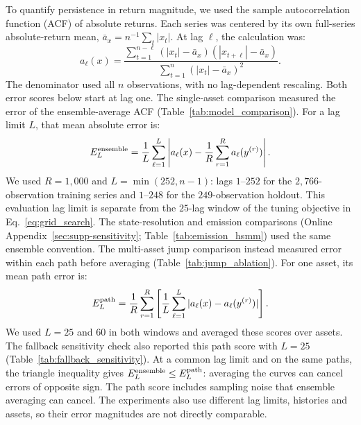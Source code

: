 To quantify persistence in return magnitude, we used the sample
autocorrelation function (ACF) of absolute returns. Each series was
centered by its own full-series absolute-return mean,
$\bar a_x=n^{-1}\sum_t|x_t|$. At lag $\ell$, the calculation was:
\begin{equation}
 a_\ell(x)=
 \frac{\sum_{t=1}^{n-\ell}(|x_t|-\bar a_x)(|x_{t+\ell}|-\bar a_x)}
      {\sum_{t=1}^{n}(|x_t|-\bar a_x)^2}.
 \label{eq:sample-absolute-acf}
\end{equation}
The denominator used all $n$ observations, with no lag-dependent
rescaling. Both error scores below start at lag one.
The single-asset comparison measured the error of the ensemble-average
ACF (Table~\ref{tab:model_comparison}). For a lag limit $L$, that
mean absolute error is:
\begin{equation}
 E^{\rm ensemble}_L=\frac{1}{L}\sum_{\ell=1}^{L}
 \left|a_\ell(x)-\frac{1}{R}\sum_{r=1}^{R}a_\ell(y^{(r)})\right|.
 \label{eq:acf-ensemble-error}
\end{equation}
We used $R=1{,}000$ and $L=\min(252,n-1)$: lags $1$--$252$
for the $2{,}766$-observation training series and $1$--$248$ for the
$249$-observation holdout. This evaluation lag limit is separate from
the $25$-lag window of the tuning objective in
Eq.~\eqref{eq:grid_search}. The state-resolution and emission
comparisons (Online Appendix~\ref{sec:supp-sensitivity}; Table~\ref{tab:emission_hsmm}) used the same ensemble convention.
The multi-asset jump comparison instead measured error within each
path before averaging (Table~\ref{tab:jump_ablation}). For one
asset, its mean path error is:
\begin{equation}
 E^{\rm path}_L=\frac{1}{R}\sum_{r=1}^{R}
       \left[\frac{1}{L}\sum_{\ell=1}^{L}
       |a_\ell(x)-a_\ell(y^{(r)})|\right].
 \label{eq:acf-path-error}
\end{equation}
We used $L=25$ and $60$ in both windows and averaged these scores
over assets. The fallback sensitivity check also reported this path
score with $L=25$ (Table~\ref{tab:fallback_sensitivity}). At a common
lag limit and on the same paths, the triangle inequality gives
$E^{\rm ensemble}_L\le E^{\rm path}_L$: averaging the curves can
cancel errors of opposite sign. The path score includes sampling noise that ensemble averaging can cancel. The experiments also use different lag limits, histories and assets, so their error magnitudes are not directly comparable.

